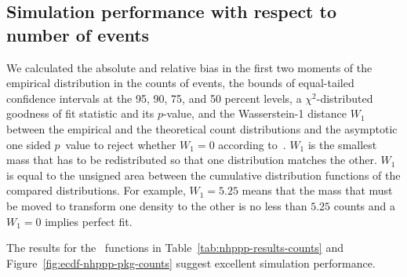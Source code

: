 \documentclass[article,nojss]{jss}\usepackage[]{graphicx}\usepackage[]{xcolor}
\begin{document}
\subsection{Simulation performance with respect to number of events}\label{sec:sim-counts}

We calculated the absolute and relative bias in the first two moments of the empirical distribution in the counts of events, the bounds of equal-tailed confidence intervals at the 95, 90, 75, and 50 percent levels, a $\chi^2$-distributed goodness of fit statistic and its $p$-value, and the Wasserstein-1 distance $W_1$ between the empirical and the theoretical count distributions and the asymptotic one sided $p$~value to reject whether $W_1 = 0$ according to~\citet{sommerfeld2018inference}. $W_1$ is the smallest mass that has to be redistributed so that one distribution matches the other. $W_1$ is equal to the unsigned area between the cumulative distribution functions of the compared distributions. For example, $W_1 = 5.25$ means that the mass that must be moved to transform one density to the other is no less than $5.25$ counts and a $W_1 = 0$ implies perfect fit.





The results for the~ functions in Table~\ref{tab:nhppp-results-counts} and Figure~\ref{fig:ecdf-nhppp-pkg-counts} suggest excellent simulation performance.
\end{document}
